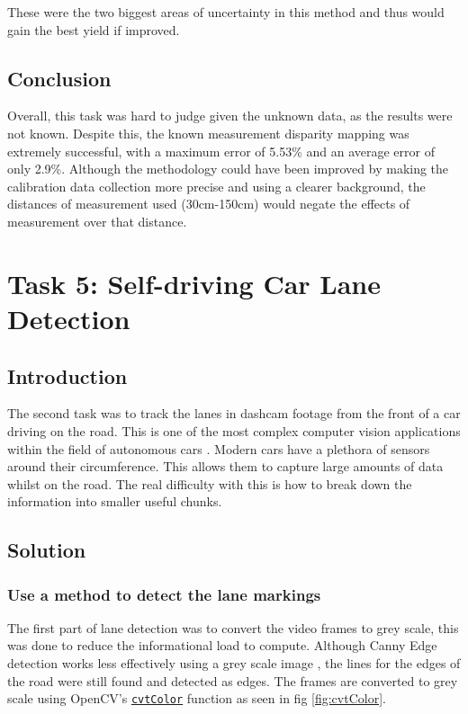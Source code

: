 \documentclass[conference]{IEEEtran}
\begin{document}
These were the two biggest areas of uncertainty in this method and thus would gain the best yield if improved. 

\subsection{Conclusion}
Overall, this task was hard to judge given the unknown data, as the results were not known. Despite this, the known measurement disparity mapping was extremely successful, with a maximum error of 5.53\% and an average error of only 2.9\%. Although the methodology could have been improved by making the calibration data collection more precise and using a clearer background, the distances of measurement used (30cm-150cm) would negate the effects of measurement over that distance. 

\section{Task 5: Self-driving Car Lane Detection}
\subsection{Introduction}

The second task was to track the lanes in dashcam footage from the front of a car driving on the road. This is one of the most complex computer vision applications within the field of autonomous cars \cite{Hajare2016AVB}. Modern cars have a plethora of sensors around their circumference. This allows them to capture large amounts of data whilst on the road. The real difficulty with this is how to break down the information into smaller useful chunks.  

\subsection{Solution}

\subsubsection{Use a method to detect the lane markings}

The first part of lane detection was to convert the video frames to grey scale, this was done to reduce the informational load to compute. Although Canny Edge detection works less effectively using a grey scale image \cite{Canny_On_Grey}, the lines for the edges of the road were still found and detected as edges. The frames are converted to grey scale using OpenCV's \href{https://docs.opencv.org/4.x/d8/d01/group__imgproc__color__conversions.html#ga397ae87e1288a81d2363b61574eb8cab}{\texttt{cvtColor}} function as seen in fig \ref{fig:cvtColor}.
\end{document}

